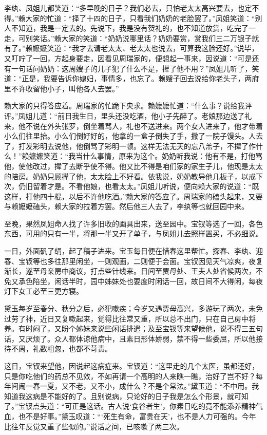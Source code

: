 \documentclass[12pt,oneside]{book}
\begin{document}
李纨、凤姐儿都笑道：“多早晚的日子？我们必去，只怕老太太高兴要去，也定不得。”赖大家的忙道：“择了十四的日子，只看我们奶奶的老脸罢了。”凤姐笑道：“别人不知道，我是一定去的。先说下，我是没有贺礼的，也不知道放赏，吃完了一走，可别笑话。”赖大家的笑道：“奶奶说哪里话？奶奶要赏，赏我们三二万银子就有了。”赖嬷嬷笑道：“我才去请老太太、老太太也说去，可算我这脸还好。”说毕，又叮咛了一回，方起身要走，因看见周瑞家的，便想起一事来，因说道：“可是还有一句话问奶奶：这周嫂子的儿子犯了什么不是，撵了他不用？”凤姐儿听了，笑道：“正是，我要告诉你媳妇，事情多，也忘了。赖嫂子回去说给你老头子，两府里不许收留他小子，叫他各人去罢。”

赖大家的只得答应着。周瑞家的忙跪下央求。赖嬷嬷忙道：“什么事？说给我评评。”凤姐儿道：“前日我生日，里头还没吃酒，他小子先醉了。老娘那边送了礼来，他不说在外头张罗，倒坐着骂人，礼也不送进来。两个女人进来了，他才带着小么们往里抬。小么们倒好好的，他拿的一盒子倒失了手，撒了一院子馒头。人去了，打发彩明去说他，他倒骂了彩明一顿。这样无法无天的忘八羔子，不撵了作什么！”赖嬷嬷笑道：“我当什么事情，原来为这个。奶奶听我说：他有不是，打他骂他，使他改过，撵了去断乎使不得。他又比不得是咱们家的家生子儿，他现是太太的陪房。奶奶只顾撵了他，太太脸上不好看。依我说，奶奶教导他几板子，以戒下次，仍旧留着才是。不看他娘，也看太太。”凤姐儿听说，便向赖大家的说道：“既这样，打他四十棍，以后不许他吃酒。”赖大家的答应了。周瑞家的磕头起来，又要与赖嬷嬷磕头，赖大家的拉着方罢。然后他三人去了，李纨等也就回园中来。

至晚，果然凤姐命人找了许多旧收的画具出来，送至园中。宝钗等选了一回，各色东西，可用的只有一半，将那一半又开了单子，与凤姐儿去照样置买，不必细说。

一日，外面矾了绢，起了稿子进来。宝玉每日便在惜春这里帮忙。探春、李纨、迎春、宝钗等也多往那里闲坐，一则观画，二则便于会面。宝钗因见天气凉爽，夜复渐长，遂至母亲房中商议，打点些针线来。日间至贾母处、王夫人处省候两次，不免又承色陪坐，闲话半时，园中姊妹处也要度时闲话一回，故日间不大得闲，每夜灯下女工必至三更方寝。

黛玉每岁至春分、秋分之后，必犯嗽疾；今岁又遇贾母高兴，多游玩了两次，未免过劳了神，近日又复嗽起来，觉得比往常又重，所以总不出门，只在自己房中将养。有时闷了，又盼个姊妹来说些闲话排遣；及至宝钗等来望候他，说不得三五句话，又厌烦了。众人都体谅他病中，且素日形体娇弱，禁不得一些委屈，所以他接待不周，礼数粗忽，也都不苛责。

这日，宝钗来望他，因说起这病症来。宝钗道：“这里走的几个太医，虽都还好，只是你吃他们的药总不见效，不如再请一个高明的人来瞧一瞧，治好了岂不好？每年间闹一春一夏，又不老，又不小，成什么？不是个常法。”黛玉道：“不中用。我知道我这病是不能好的了。且别说病，只论好的日子我是怎么个形景，就可知了。”宝钗点头道：“可正是这话。古人说‘食谷者生’，你素日吃的竟不能添养精神气血，也不是好事。”黛玉叹道：“‘死生有命，富贵在天’，也不是人力可强的。今年比往年反觉又重了些似的。”说话之间，已咳嗽了两三次。
\end{document}
